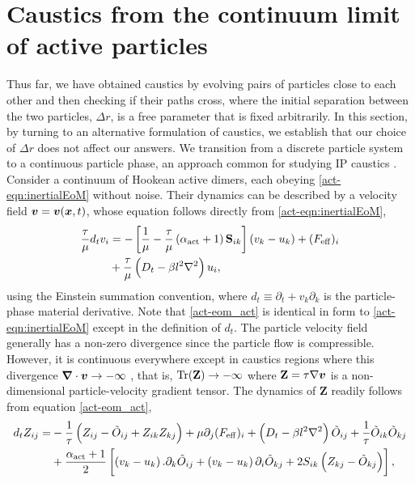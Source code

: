\documentclass[../Rajarshi-thesis-draft.tex]{subfiles}
\begin{document}
\section{Caustics from the continuum limit of active particles} \label{act-Continuum}
Thus far, we have obtained caustics by evolving pairs of particles close to each other and then checking if their paths cross, where the initial separation between the two particles, $\Delta r$, is a free parameter that is fixed arbitrarily. In this section, by turning to an alternative formulation of caustics, we establish that our choice of $\Delta r$ does not affect our answers. We transition from a discrete particle system to a continuous particle phase, an approach common for studying IP caustics \cite{falkovich2002,meibohm2021,PRL2023}. Consider a continuum of Hookean active dimers, each obeying \eqref{act-eqn:inertialEoM} without noise. Their dynamics can be described by a velocity field $\boldsymbol{v}=\boldsymbol{v}(\boldsymbol{x},t)$, whose equation follows directly from \eqref{act-eqn:inertialEoM}, 
\begin{align}
        \label{act-eom_act}
        \frac{\tau}{\mu}d_t v_i & = -\left[ \frac{1}{\mu} - \frac{\tau}{\mu}\left( \alpha_{\rm act} + 1 \right)%
        \mathbf{S}_{ik} \right] \left( v_k - u_k \right) + (F_{\rm eff})_i  \nonumber \\
        & + \frac{\tau}{\mu}\left( D_t - \beta l^2 \nabla^2  \right)u_i ,
    \end{align}
using the Einstein summation convention, where $d_t \equiv \partial_t  + v_k\partial_k$ is the particle-phase material derivative. 
Note that \eqref{act-eom_act} is identical in form to \eqref{act-eqn:inertialEoM} except in the definition of $d_t$.
The particle velocity field generally has a non-zero divergence since the particle flow is compressible. However, it is continuous everywhere except in caustics regions where this divergence $\boldsymbol{\nabla}\cdot\boldsymbol{v}\to -\infty$ \cite{meibohm2021}, that is, $\operatorname{Tr}(\mathbf{Z}) \to -\infty$ where $\mathbf{Z} =\tau\nabla\boldsymbol{v}$ is a non-dimensional particle-velocity gradient tensor.
The dynamics of $\mathbf{Z}$ readily follows from equation \eqref{act-eom_act},
    \begin{align}
        \label{act-zevol_act}
            d_tZ_{ij} = &-\frac{1}{\tau}\left( Z_{ij} - \tilde{O}_{ij} +Z_{ik}Z_{kj} \right)+ \mu\partial_j(F_{\rm eff})_i + \left( D_t - \beta l^2 \nabla^2  \right)\tilde{O}_{ij} +\frac{1}{\tau}\tilde{O}_{ik}\tilde{O}_{kj} \nonumber \\
            &+ \frac{ \alpha_{\rm act} + 1}{2}\left[ \left( v_k -u_k \right).\partial_k
            {\tilde{O}_{ij}} + \left( v_k - u_k \right)\partial_i\tilde{O}_{kj} + 2S_{ik}\left( Z_{kj} - \tilde{O}_{kj}\right) \right] ,
        \end{align}
\end{document}
